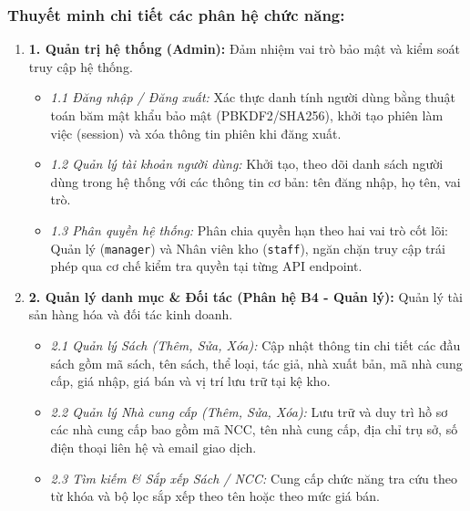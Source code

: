 \documentclass[12pt,a4paper]{article}
\begin{document}
\subsubsection*{Thuyết minh chi tiết các phân hệ chức năng:}
\begin{enumerate}
    \item \textbf{1. Quản trị hệ thống (Admin):} Đảm nhiệm vai trò bảo mật và kiểm soát truy cập hệ thống.
    \begin{itemize}
        \item \textit{1.1 Đăng nhập / Đăng xuất:} Xác thực danh tính người dùng bằng thuật toán băm mật khẩu bảo mật (PBKDF2/SHA256), khởi tạo phiên làm việc (session) và xóa thông tin phiên khi đăng xuất.
        \item \textit{1.2 Quản lý tài khoản người dùng:} Khởi tạo, theo dõi danh sách người dùng trong hệ thống với các thông tin cơ bản: tên đăng nhập, họ tên, vai trò.
        \item \textit{1.3 Phân quyền hệ thống:} Phân chia quyền hạn theo hai vai trò cốt lõi: Quản lý (\texttt{manager}) và Nhân viên kho (\texttt{staff}), ngăn chặn truy cập trái phép qua cơ chế kiểm tra quyền tại từng API endpoint.
    \end{itemize}

    \item \textbf{2. Quản lý danh mục \& Đối tác (Phân hệ B4 - Quản lý):} Quản lý tài sản hàng hóa và đối tác kinh doanh.
    \begin{itemize}
        \item \textit{2.1 Quản lý Sách (Thêm, Sửa, Xóa):} Cập nhật thông tin chi tiết các đầu sách gồm mã sách, tên sách, thể loại, tác giả, nhà xuất bản, mã nhà cung cấp, giá nhập, giá bán và vị trí lưu trữ tại kệ kho.
        \item \textit{2.2 Quản lý Nhà cung cấp (Thêm, Sửa, Xóa):} Lưu trữ và duy trì hồ sơ các nhà cung cấp bao gồm mã NCC, tên nhà cung cấp, địa chỉ trụ sở, số điện thoại liên hệ và email giao dịch.
        \item \textit{2.3 Tìm kiếm \& Sắp xếp Sách / NCC:} Cung cấp chức năng tra cứu theo từ khóa và bộ lọc sắp xếp theo tên hoặc theo mức giá bán.
    \end{itemize}


\end{enumerate}
\end{document}
